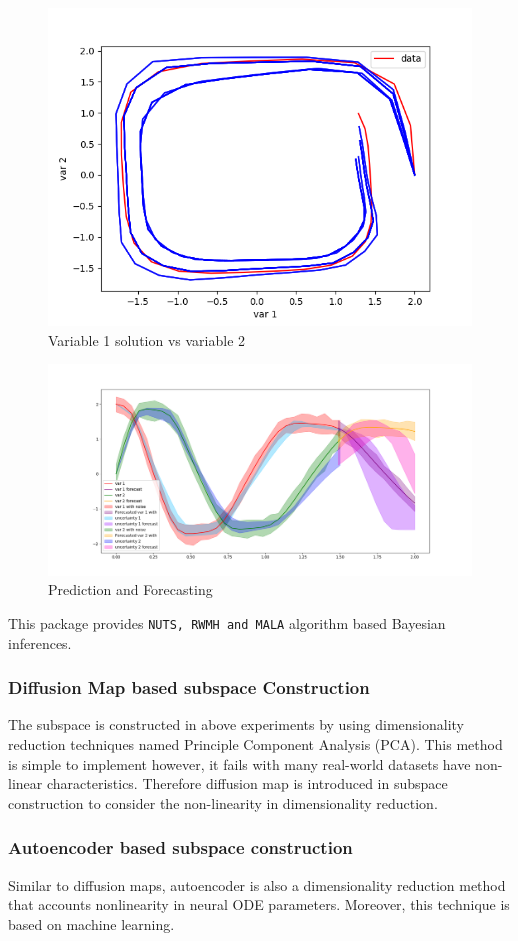 \documentclass[12pt,a4paper]{article}
\begin{document}
\begin{figure}
\centering
\includegraphics{img/var_1_2.png}
\caption{Variable 1 solution vs variable 2}
\end{figure}
 \begin{figure}
\centering
\includegraphics{img/single_plot_forecasting.png}
\caption{Prediction and Forecasting}
\end{figure}


This package provides \texttt{NUTS, RWMH and MALA} algorithm based Bayesian inferences.

\subsubsection{Diffusion Map based subspace Construction}
The subspace is constructed in above experiments by using dimensionality reduction techniques named Principle Component Analysis (PCA). This method is simple to implement however, it fails with many real-world datasets have non-linear characteristics. Therefore diffusion map is introduced in subspace construction to consider the non-linearity in dimensionality reduction.

\subsubsection{Autoencoder based subspace construction}
Similar to diffusion maps, autoencoder is also a dimensionality reduction method that accounts nonlinearity in neural ODE parameters. Moreover, this technique is  based on machine learning. 
\end{document}
